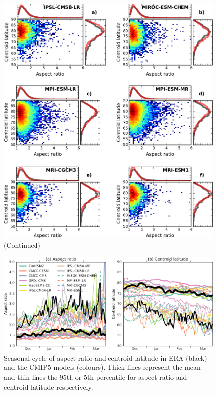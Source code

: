 \begin{figure}
 \ContinuedFloat
 \centering
 \noindent\includegraphics[width=\textwidth]{figures/chapter-models/moments_stats2.pdf}
 \caption[]{(Continued)}
 \label{Fig2}
\end{figure}
 
\begin{figure}
 \centering
 \noindent\includegraphics[width=\textwidth]{figures/chapter-models/moments_seasonal_stats.pdf}
 \caption[Seasonal cycle of moment diagnostics in the CMIP5 models]{Seasonal
   cycle of aspect ratio and centroid latitude in ERA (black) and the CMIP5
   models (colours). Thick lines represent the mean and thin lines the 95th or
   5th percentile for aspect ratio and centroid latitude respectively.}
 \label{Fig2}
\end{figure}



